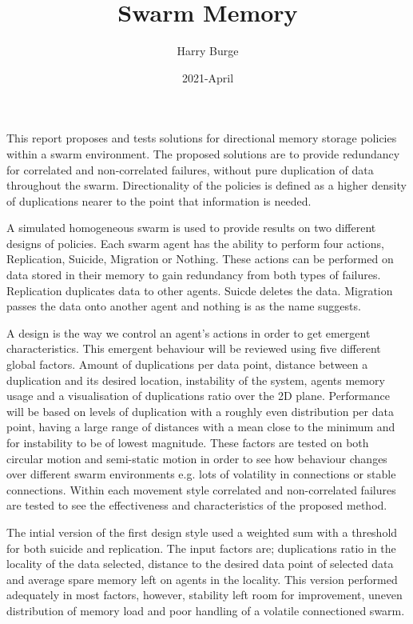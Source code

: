 \documentclass{UoYCSproject}
\author{Harry Burge}
\title{Swarm Memory}
\date{2021-April}
\begin{document}
\maketitle
\listoffigures



\begin{summary}
This report proposes and tests solutions for directional memory storage policies within a swarm environment. The proposed solutions are to provide redundancy for correlated and non-correlated failures, without pure duplication of data throughout the swarm. Directionality of the policies is defined as a higher density of duplications nearer to the point that information is needed.

A simulated homogeneous swarm is used to provide results on two different designs of policies. Each swarm agent has the ability to perform four actions, Replication, Suicide, Migration or Nothing. These actions can be performed on data stored in their memory to gain redundancy from both types of failures. Replication duplicates data to other agents. Suicde deletes the data. Migration passes the data onto another agent and nothing is as the name suggests.

A design is the way we control an agent's actions in order to get emergent characteristics. This emergent behaviour will be reviewed using five different global factors. Amount of duplications per data point, distance between a duplication and its desired location, instability of the system, agents memory usage and a visualisation of duplications ratio over the 2D plane. Performance will be based on levels of duplication with a roughly even distribution per data point, having a large range of distances with a mean close to the minimum and for instability to be of lowest magnitude. These factors are tested on both circular motion and semi-static motion in order to see how behaviour changes over different swarm environments e.g. lots of volatility in connections or stable connections. Within each movement style correlated and non-correlated failures are tested to see the effectiveness and characteristics of the proposed method.

The intial version of the first design style used a weighted sum with a threshold for both suicide and replication. The input factors are; duplications ratio in the locality of the data selected, distance to the desired data point of selected data and average spare memory left on agents in the locality. This version performed adequately in most factors, however, stability left room for improvement, uneven distribution of memory load and poor handling of a volatile connectioned swarm.


\end{summary}
\end{document}
